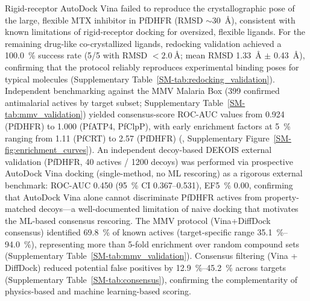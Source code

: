 \documentclass[journal=jcisd8,manuscript=article]{achemso}
\begin{document}
Rigid-receptor AutoDock Vina failed to reproduce the crystallographic pose of the large, flexible MTX inhibitor in PfDHFR (RMSD $\sim$\qty{30}{\angstrom}), consistent with known limitations of rigid-receptor docking for oversized, flexible ligands. For the remaining drug-like co-crystallized ligands, redocking validation achieved a \qty{100.0}{\percent} success rate (5/5 with RMSD $< \qty{2.0}{\angstrom}$; mean RMSD \qty{1.33}{\angstrom} $\pm$ \qty{0.43}{\angstrom}), confirming that the protocol reliably reproduces experimental binding poses for typical molecules (Supplementary Table~\ref{SM-tab:redocking_validation}). Independent benchmarking against the MMV Malaria Box (\num{399} confirmed antimalarial actives by target subset; Supplementary Table~\ref{SM-tab:mmv_validation}) yielded consensus-score ROC-AUC values from \num{0.924} (PfDHFR) to \num{1.000} (PfATP4, PfClpP), with early enrichment factors at \qty{5}{\percent} ranging from \num{1.11} (PfCRT) to \num{2.57} (PfDHFR) (, Supplementary Figure~\ref{SM-fig:enrichment_curves}). An independent decoy-based DEKOIS external validation (PfDHFR, \num{40} actives / \num{1200} decoys) was performed via prospective AutoDock Vina docking (single-method, no ML rescoring) as a rigorous external benchmark: ROC-AUC \num{0.450} (\qty{95}{\percent} CI \numrange{0.367}{0.531}), EF\qty{5}{\percent} \num{0.00}, confirming that AutoDock Vina alone cannot discriminate PfDHFR actives from property-matched decoys---a well-documented limitation of naive docking \cite{Bauer2013} that motivates the ML-based consensus rescoring. The MMV protocol (Vina+DiffDock consensus) identified \qty{69.8}{\percent} of known actives (target-specific range \qtyrange{35.1}{94.0}{\percent}), representing more than \num{5}-fold enrichment over random compound sets (Supplementary Table~\ref{SM-tab:mmv_validation}). Consensus filtering (Vina + DiffDock) reduced potential false positives by \qtyrange{12.9}{45.2}{\percent} across targets (Supplementary Table~\ref{SM-tab:consensus}), confirming the complementarity of physics-based and machine learning-based scoring.
\end{document}
